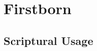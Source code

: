 \section{Firstborn}
	\label{FIRSTBORN}
	




	


\subsection{Scriptural Usage} %
	\label{FIRSTBORN-SCRIPTURES}

